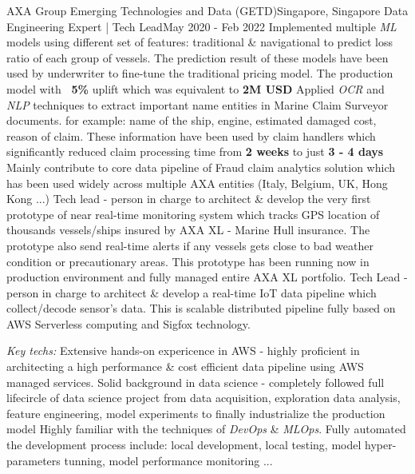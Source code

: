     \resumeSubheading
      {AXA Group Emerging Technologies and Data (GETD)}{Singapore, Singapore}
      {Data Engineering Expert | Tech Lead}{May 2020 - Feb 2022}
      \resumeItemListStart
          {Implemented multiple \emph{ML} models using different set of features: traditional \& navigational to predict loss ratio of each group of vessels. The prediction result of these models have been used by underwriter to fine-tune the traditional pricing model. The production model with \textbf{~5\%} uplift which was equivalent to \textbf{2M USD}}
          {Applied \emph{OCR} and \emph{NLP} techniques to extract important name entities in Marine Claim Surveyor documents. for example: name of the ship, engine, estimated damaged cost, reason of claim. These information have been used by claim handlers which significantly reduced claim processing time from \textbf{2 weeks} to just \textbf{3 - 4 days}}
          {Mainly contribute to core data pipeline of Fraud claim analytics solution which has been used widely across multiple AXA entities (Italy, Belgium, UK, Hong Kong ...)}
          {Tech lead - person in charge to architect \& develop the very first prototype of near real-time monitoring system which tracks GPS location of thousands vessels/ships insured by AXA XL - Marine Hull insurance. The prototype also send real-time alerts if any vessels gets close to bad weather condition or precautionary areas. This prototype has been running now in production environment and fully managed entire AXA XL portfolio.}
          {Tech Lead - person in charge to architect \& develop a real-time IoT data pipeline which collect/decode sensor’s data. This is scalable distributed pipeline fully based on AWS Serverless computing and Sigfox technology.}
      \resumeItemListEnd

      \emph{Key techs:}
      \resumeItemListStart
          {Extensive hands-on expericence in AWS - highly proficient in architecting a high performance \& cost efficient data pipeline using AWS managed services.}
          {Solid background in data science - completely followed full lifecircle of data science project from data acquisition, exploration data analysis, feature engineering,
          model experiments to finally industrialize the production model}
          {Highly familiar with the techniques of \emph{DevOps} \& \emph{MLOps}. Fully automated the development process include: local development, local testing, model hyper-parameters tunning, model performance monitoring ...}
      \resumeItemListEnd

